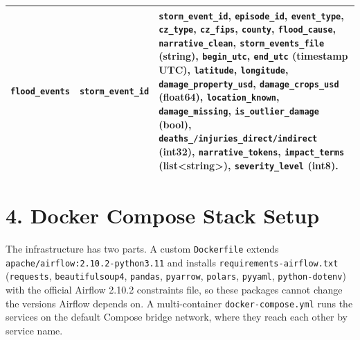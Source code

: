 \documentclass[stu, 12pt, letterpaper, donotrepeattitle, floatsintext, natbib]{apa7}
\begin{document}
\begin{table}[H]
\begin{tabularx}{\textwidth}{>{\raggedright\arraybackslash}p{3.0cm} >{\raggedright\arraybackslash}p{2.6cm} >{\raggedright\arraybackslash}X}
\addlinespace
\texttt{flood\_events} & \texttt{storm\_event\_id} & \textbf{\texttt{storm\_event\_id}}, \texttt{episode\_id}, \textbf{\texttt{event\_type}}, \textbf{\texttt{cz\_type}}, \textbf{\texttt{cz\_fips}}, \textbf{\texttt{county}}, \textbf{\texttt{flood\_cause}}, \texttt{narrative\_clean}, \texttt{storm\_events\_file} (string), \textbf{\texttt{begin\_utc}}, \texttt{end\_utc} (timestamp UTC), \texttt{latitude}, \texttt{longitude}, \texttt{damage\_property\_usd}, \texttt{damage\_crops\_usd} (float64), \textbf{\texttt{location\_known}}, \textbf{\texttt{damage\_missing}}, \textbf{\texttt{is\_outlier\_damage}} (bool), \textbf{\texttt{deaths\_/injuries\_direct/indirect}} (int32), \texttt{narrative\_tokens}, \texttt{impact\_terms} (list<string>), \textbf{\texttt{severity\_level}} (int8). \\
\bottomrule
\end{tabularx}
\end{table}

\section{\large 4. Docker Compose Stack Setup}
The infrastructure has two parts. A custom \texttt{Dockerfile} extends \texttt{apache/airflow:2.10.2-python3.11} and installs \texttt{requirements-airflow.txt} (\texttt{requests}, \texttt{beautifulsoup4}, \texttt{pandas}, \texttt{pyarrow}, \texttt{polars}, \texttt{pyyaml}, \texttt{python-dotenv}) with the official Airflow 2.10.2 constraints file, so these packages cannot change the versions Airflow depends on. A multi-container \texttt{docker-compose.yml} runs the services on the default Compose bridge network, where they reach each other by service name.
\end{document}
